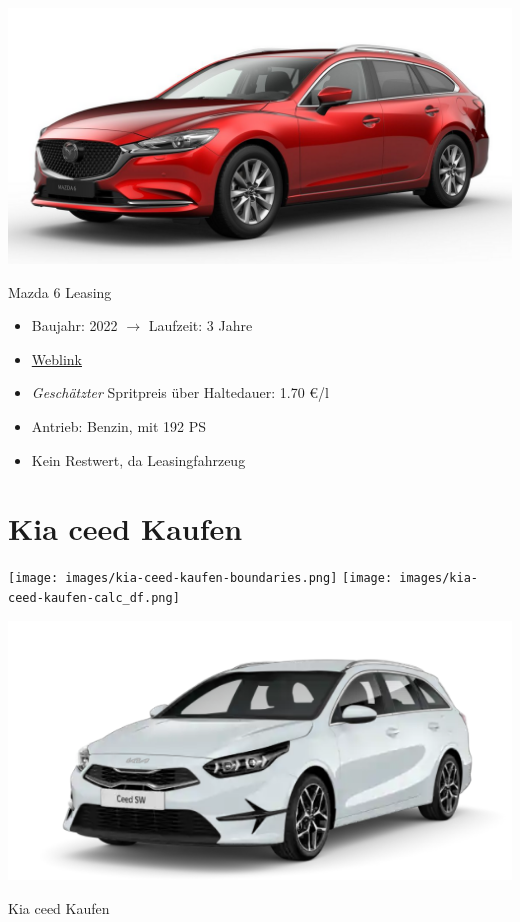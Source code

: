\documentclass[landscape, DIV=99, 14pt]{scrartcl}
\begin{document}
\pagebreak
\null
\vspace{2cm}
\begin{center}
\includegraphics[width=0.9\columnwidth]{cars/mazda-6-leasing.png}

Mazda 6 Leasing
\end{center}

\begin{itemize}
    \item Baujahr: 2022 $\rightarrow$ Laufzeit: 3 Jahre
    \item \href{https://konfigurator.meinauto.de/mazda/neuwagen/48-6/angebote/6-kombi/konfigurator/\#!/extras/exclusive-line/8846370/10,11,15/private/65352-5416-204698/984/61c9aa657e74c/leasing/16040--249432/36,3000,15000,0,0,0,0,0,}{Weblink}
    \item \emph{Gesch\"atzter} Spritpreis \"uber Haltedauer: 1.70 \euro{}/l
    \item Antrieb: Benzin, mit 192 PS
    \item Kein Restwert, da Leasingfahrzeug
\end{itemize}

\pagebreak


\twocolumn

\section*{Kia ceed Kaufen}
\begin{center}
\texttt{[image: images/kia-ceed-kaufen-boundaries.png]}
\null
\vspace{0.5cm}
\texttt{[image: images/kia-ceed-kaufen-calc\_df.png]}
\end{center}

\pagebreak
\null
\vspace{2cm}
\begin{center}
\includegraphics[width=0.9\columnwidth]{cars/kia-ceed-sportswagon.png}

Kia ceed Kaufen
\end{center}
\end{document}
